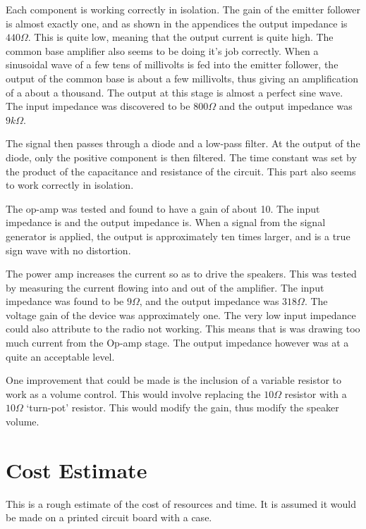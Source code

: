 \documentclass[a4paper,10pt]{report}
\begin{document}
Each component is working correctly in isolation.  The gain of the
emitter follower is almost exactly one, and as shown in the appendices
the output impedance is $440\Omega$.  This is quite low, meaning that
the output current is quite high.  The common base amplifier also
seems to be doing it's job correctly.  When a sinusoidal wave of a few
tens of millivolts is fed into the emitter follower, the output of the
common base is about a few millivolts, thus giving an amplification of
a about a thousand.  The output at this stage is almost a perfect sine
wave.  The input impedance was discovered to be $800\Omega$ and the 
output impedance was $9k\Omega$.

The signal then passes through a diode and a low-pass filter.  At the
output of the diode, only the positive component is then filtered.
The time constant was set by the product of the capacitance and
resistance of the circuit.  This part also seems to work correctly in
isolation.

The op-amp was tested and found to have a gain of about 10.  The input
impedance is and the output impedance is.  When a signal from the
signal generator is applied, the output is approximately ten times
larger, and is a true sign wave with no distortion.

The power amp increases the current so as to drive the speakers.  This
was tested by measuring the current flowing into and out of the
amplifier.  The input impedance was found to be $9\Omega$, and the 
output impedance was $318\Omega$.  The voltage gain of the device was
approximately one.  The very low input impedance could also attribute
to the radio not working.  This means that is was drawing too much current 
from the Op-amp stage.  The output impedance however was at a quite
an acceptable level.

One improvement that could be made is the inclusion of a variable
resistor to work as a volume control.  This would involve replacing
the $10\Omega$ resistor with a $10\Omega$ `turn-pot' resistor.  This
would modify the gain, thus modify the speaker volume.

\chapter{Cost Estimate}
This is a rough estimate of the cost of resources and time.  It is assumed
it would be made on a printed circuit board with a case.
\end{document}
